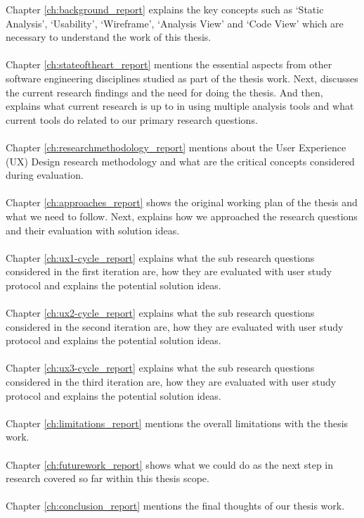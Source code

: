 \noindent Chapter \ref{ch:background_report} explains the key concepts such as ‘Static Analysis’, ‘Usability’, ‘Wireframe’, ‘Analysis View’ and ‘Code View’ which are necessary to understand the work of this thesis. \\ \\
Chapter \ref{ch:stateoftheart_report} mentions the essential aspects from other software engineering disciplines studied as part of the thesis work. Next, discusses the current research findings and the need for doing the thesis. And then, explains what current research is up to in using multiple analysis tools and what current tools do related to our primary research questions. \\ \\
Chapter \ref{ch:researchmethodology_report} mentions about the User Experience (UX) Design research methodology and what are the critical concepts considered during evaluation. \\ \\
Chapter \ref{ch:approaches_report} shows the original working plan of the thesis and what we need to follow. Next, explains how we approached the research questions and their evaluation with solution ideas. \\ \\
Chapter \ref{ch:ux1-cycle_report} explains what the sub research questions considered in the first iteration are, how they are evaluated with user study protocol and explains the potential solution ideas. \\ \\
Chapter \ref{ch:ux2-cycle_report} explains what the sub research questions considered in the second iteration are, how they are evaluated with user study protocol and explains the potential solution ideas. \\ \\
Chapter \ref{ch:ux3-cycle_report} explains what the sub research questions considered in the third iteration are, how they are evaluated with user study protocol and explains the potential solution ideas. \\ \\
Chapter \ref{ch:limitations_report} mentions the overall limitations with the thesis work. \\ \\
Chapter \ref{ch:futurework_report} shows what we could do as the next step in research covered so far within this thesis scope. \\ \\
Chapter \ref{ch:conclusion_report} mentions the final thoughts of our thesis work. \\ \\

\let\cleardoublepage\clearpage
\emptypage